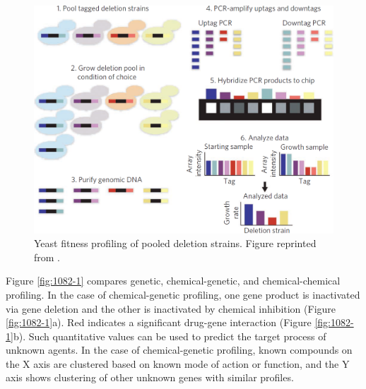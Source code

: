 \documentclass[12pt,fullpage,singlespace]{article}
\begin{document}
\begin{figure}
\centering
\includegraphics[width=\linewidth]{1081-1.png}
\caption{Yeast fitness profiling of pooled deletion strains. Figure reprinted from \citep{1081}.}
\label{fig:1081-1}
\end{figure}

Figure \ref{fig:1082-1} compares genetic, chemical-genetic, and chemical-chemical profiling. In the case of chemical-genetic profiling, one gene product is inactivated via gene deletion and the other is inactivated by chemical inhibition (Figure \ref{fig:1082-1}a). Red indicates a significant drug-gene interaction (Figure \ref{fig:1082-1}b). Such quantitative values can be used to predict the target process of unknown agents. In the case of chemical-genetic profiling, known compounds on the X axis are clustered based on known mode of action or function, and the Y axis shows clustering of other unknown genes with similar profiles.
\end{document}
